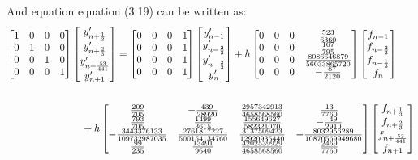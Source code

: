 \documentclass[12pt]{report}
\begin{document}
\noindent And equation equation (3.19) can be written as:
\begin{align}
\begin{split}
\begin{bmatrix}
1 & 0 & 0 & 0\\
0 & 1 & 0 & 0\\
0 & 0 & 1 & 0\\
0 & 0 & 0 & 1
\end{bmatrix}
\begin{bmatrix}
y'_{n+\frac{1}{3}}\\ y'_{n+\frac{2}{3}} \\ y'_{n+\frac{53}{441}} \\ y'_{n+1}
\end{bmatrix}
&= \begin{bmatrix}
0 & 0 & 0 & 1\\
0 & 0 & 0 & 1\\
0 & 0 & 0 & 1\\
0 & 0 & 0 & 1
\end{bmatrix}\begin{bmatrix}
y'_{n-1}\\ y'_{n-\frac{2}{3}} \\ y'_{n-\frac{2}{3}} \\ y'_{n}
\end{bmatrix}
+h
\begin{bmatrix}
0 & 0 & 0 & \frac{523}{6360}\\
0 & 0 & 0 & \frac{167}{795}\\
0 & 0 & 0 & \frac{8086646879}{56033865720}\\
0 & 0 & 0 & -\frac{87}{2120}
\end{bmatrix}\begin{bmatrix}
f_{n-1}\\ f_{n-\frac{2}{3}} \\ f_{n-\frac{1}{3}} \\ f_{n}
\end{bmatrix}\\\\
&\hspace{-12mm}
+h\begin{bmatrix}
\frac{209}{705} & -\frac{439}{28920}& \frac{2957342913}{4658568560} & \frac{13}{7760}\\
\frac{793}{705} & \frac{1499}{3615} & \frac{155649627}{582321070} & -\frac{49}{2910}\\
-\frac{3443376133}{109732987035} & \frac{2761817227}{500154134760} & \frac{3137509423}{12920935440} & -\frac{8032956289}{10870569949680}\\
\frac{99}{235} & \frac{13491}{9640} & \frac{4202539929}{4658568560} & \frac{2469}{7760}
\end{bmatrix}\begin{bmatrix}
f_{n+\frac{1}{3}}\\ f_{n+\frac{2}{3}} \\ f_{n+\frac{53}{441}} \\ f_{n+1}
\end{bmatrix}
\end{split}
\end{align}
\end{document}
